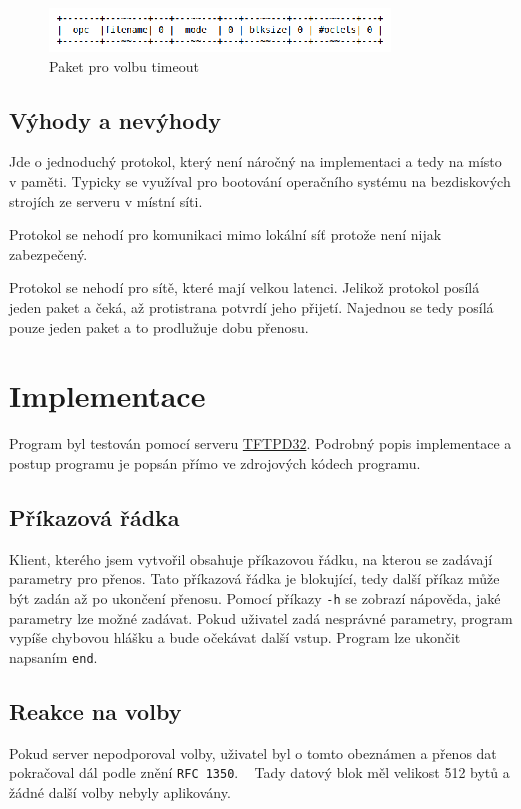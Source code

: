 \documentclass[11pt]{article}
\begin{document}
\begin{figure}[ht]
    \label{pict:RFC_1348_blksize.eps} 
    \centering
    \includegraphics[scale=2.0]{RFC_2348_blksize}
    \caption{Paket pro volbu timeout \cite{extension_blksize}}        
\end{figure}

\subsection{Výhody a nevýhody}
Jde o jednoduchý protokol, který není náročný na implementaci a tedy na místo v paměti. Typicky se využíval pro bootování 
operačního systému na bezdiskových strojích ze serveru v místní síti. \cite{WIKI}

Protokol se nehodí pro komunikaci mimo lokální síť protože není nijak zabezpečený.

Protokol se nehodí pro sítě, které mají velkou latenci. Jelikož protokol posílá jeden paket a čeká, až protistrana potvrdí jeho přijetí. 
Najednou se tedy posílá pouze jeden paket a to prodlužuje dobu přenosu. \cite{WIKI}
 
\section{Implementace}
Program byl testován pomocí serveru \href{https://pjo2.github.io/tftpd64/}{TFTPD32}. Podrobný popis implementace a postup programu je popsán přímo ve zdrojových kódech programu.

\subsection{Příkazová řádka}
Klient, kterého jsem vytvořil obsahuje příkazovou řádku, na kterou se zadávají parametry pro přenos. Tato příkazová řádka je blokující, tedy
další příkaz může být zadán až po ukončení přenosu. Pomocí příkazy \texttt{-h} se zobrazí nápověda, jaké parametry lze možné zadávat. Pokud uživatel
zadá nesprávné parametry, program vypíše chybovou hlášku a bude očekávat další vstup. Program lze ukončit napsaním \texttt{end}.

\subsection{Reakce na volby}
Pokud server nepodporoval volby, uživatel byl o tomto obeznámen a přenos dat pokračoval dál podle znění \texttt{RFC~1350}. ~\cite{revision2}
Tady datový blok měl velikost 512 bytů a žádné další volby nebyly aplikovány.
\end{document}
